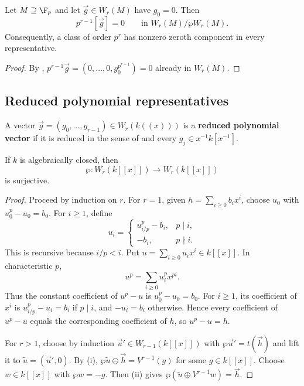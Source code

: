 \begin{cor}\label{cor:asw_class_order_and_first_component}
Let $M\supseteq\F_p$ and let $\vec g\in W_r(M)$ have $g_0=0$. Then
\[
p^{r-1}[\vec g]=0 \qquad\text{in } W_r(M)/\wp W_r(M).
\]
Consequently, a class of
order $p^r$ has nonzero zeroth component in every representative.
\end{cor}

\begin{proof}
By ,
$p^{r-1}\vec g=(0,\dots,0,g_0^{p^{r-1}})=0$ already in $W_r(M)$.
\end{proof}

\subsection{Reduced polynomial representatives}

\begin{definition}\label{definition:reduced_polynomial_vector}
A vector $\vec g=(g_0,\dots,g_{r-1})\in W_r(k((x)))$ is a
\textbf{reduced polynomial vector} if it is reduced in the sense of
 and every
$g_j\in x^{-1}k[x^{-1}]$.
\end{definition}

\begin{lemma}
\label{lemma:wp_surjective_on_integral_witt}
If $k$ is algebraically closed, then
\[
\wp:W_r(k[[x]])\longrightarrow W_r(k[[x]])
\]
is surjective.
\end{lemma}

\begin{proof}
Proceed by induction on $r$. For $r=1$, given
$h=\sum_{i\geq0}b_ix^i$, choose $u_0$ with
$u_0^p-u_0=b_0$. For $i\geq1$, define
\[
u_i=
\begin{cases}
u_{i/p}^p-b_i,& p\mid i,\\
-b_i,& p\nmid i.
\end{cases}
\]
This is recursive because $i/p<i$. Put
$u=\sum_{i\geq0}u_ix^i\in k[[x]]$. In characteristic $p$,
\[
u^p=\sum_{i\geq0}u_i^p x^{pi}.
\]
Thus the constant coefficient of $u^p-u$ is $u_0^p-u_0=b_0$.
For $i\geq1$, its coefficient of $x^i$ is $u_{i/p}^p-u_i=b_i$
if $p\mid i$, and $-u_i=b_i$ otherwise. Hence every coefficient
of $u^p-u$ equals the corresponding coefficient of $h$, so $u^p-u=h$.

For $r>1$, choose by induction $\vec u'\in W_{r-1}(k[[x]])$ with
$\wp\vec u'=t(\vec h)$ and lift it to
$\widetilde u=(\vec u',0)$. By (i),
$\wp\widetilde u\ominus\vec h=V^{r-1}(g)$ for some $g\in k[[x]]$.
Choose $w\in k[[x]]$ with $\wp w=-g$. Then
(ii) gives
$\wp(\widetilde u\oplus V^{r-1}w)=\vec h$.
\end{proof}

